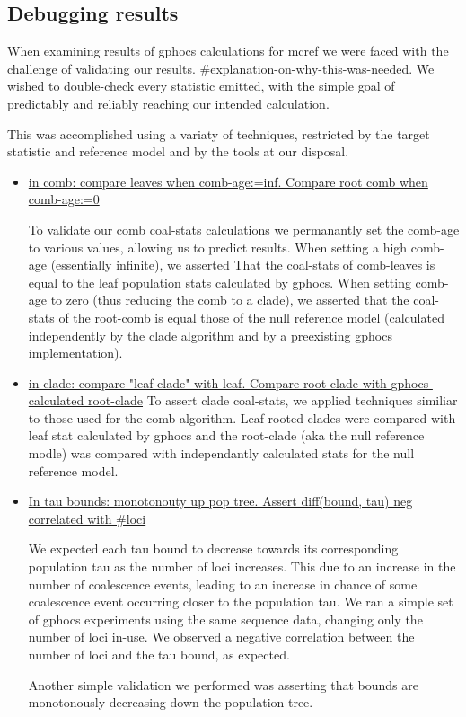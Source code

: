 \documentclass[10pt,a4paper]{article}
\begin{document}
\subsection{Debugging results}

When examining results of gphocs calculations for mcref we were faced with the challenge of validating our results. \#explanation-on-why-this-was-needed. We wished to double-check every statistic emitted, with the simple goal of predictably and reliably reaching our intended calculation.

This was accomplished using a variaty of techniques, restricted by the target statistic and reference model and by the tools at our disposal. 


\begin{itemize}

\item \underline{in comb: compare leaves when comb-age:=inf. Compare root comb when comb-age:=0}

To validate our comb coal-stats calculations we permanantly set the comb-age to various values, allowing us to predict results. When setting a high comb-age (essentially infinite), we asserted That the coal-stats of comb-leaves is equal to the leaf population stats calculated by gphocs. When setting comb-age to zero (thus reducing the comb to a clade), we asserted that the coal-stats of the root-comb is equal those of the null reference model (calculated independently by the clade algorithm and by a preexisting gphocs implementation).



\item \underline{in clade: compare "leaf clade" with leaf. Compare root-clade with gphocs-calculated root-clade}
To assert clade coal-stats, we applied techniques similiar to those used for the comb algorithm. Leaf-rooted clades were compared with leaf stat calculated by gphocs and the root-clade (aka the null reference modle) was compared with independantly calculated stats for the null reference model. 

\item \underline{In tau bounds: monotonouty up pop tree. Assert diff(bound, tau) neg correlated with \#loci}

We expected each tau bound to decrease towards its corresponding population tau as the number of loci increases. This due to an increase in the number of coalescence events, leading to an increase in chance of some coalescence event occurring closer to the population tau. We ran a simple set of gphocs experiments using the same sequence data, changing only the number of loci in-use. We observed a negative correlation between the number of loci and the tau bound, as expected.

Another simple validation we performed was asserting that bounds are monotonously decreasing down the population tree.

\end{itemize}
\end{document}
